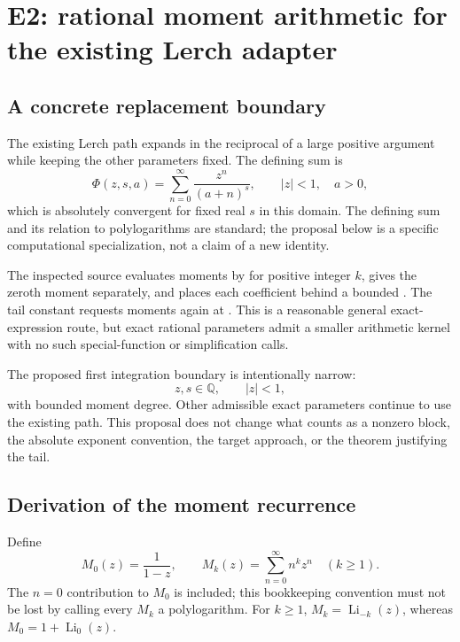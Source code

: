 \documentclass[11pt,letterpaper]{article}
\newcommand{\code}[1]{\texttt{\detokenize{#1}}}
\newcommand{\QQ}{\mathbb Q}
\newcommand{\Li}{\operatorname{Li}}
\begin{document}
\section{E2: rational moment arithmetic for the existing Lerch adapter}
\label{sec:e2}
\subsection{A concrete replacement boundary}
The existing Lerch path expands in the reciprocal of a large positive argument while keeping the other parameters fixed. The defining sum is
\begin{equation}
 \Phi(z,s,a)=\sum_{n=0}^\infty\frac{z^n}{(a+n)^s},
 \qquad |z|<1,\quad a>0,
 \label{eq:lerch}
\end{equation}
which is absolutely convergent for fixed real $s$ in this domain. The defining sum and its relation to polylogarithms are standard; the proposal below is a specific computational specialization, not a claim of a new identity.\cite{dlmf-lerch,dlmf-polylog}

The inspected source evaluates moments by \code{PolyLog[-k,z]} for positive integer $k$, gives the zeroth moment separately, and places each coefficient behind a bounded \code{FullSimplify}. The tail constant requests moments again at \code{Abs[z]}. This is a reasonable general exact-expression route, but exact rational parameters admit a smaller arithmetic kernel with no such special-function or simplification calls.\cite{dirichlet}

The proposed first integration boundary is intentionally narrow:
\[
 z,s\in\QQ,\qquad |z|<1,
\]
with bounded moment degree. Other admissible exact parameters continue to use the existing path. This proposal does not change what counts as a nonzero block, the absolute exponent convention, the target approach, or the theorem justifying the tail.

\subsection{Derivation of the moment recurrence}
Define
\begin{equation}
 M_0(z)=\frac1{1-z},\qquad
 M_k(z)=\sum_{n=0}^\infty n^k z^n\quad(k\ge1).
 \label{eq:moments}
\end{equation}
The $n=0$ contribution to $M_0$ is included; this bookkeeping convention must not be lost by calling every $M_k$ a polylogarithm. For $k\ge1$, $M_k=\Li_{-k}(z)$, whereas $M_0=1+\Li_0(z)$.
\end{document}
